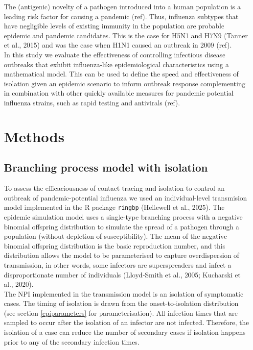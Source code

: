 \documentclass{article}
\begin{document}
The (antigenic) novelty of a pathogen introduced into a human population is a leading risk factor for causing a pandemic (ref). Thus, influenza subtypes that have negligible levels of existing immunity in the population are probable epidemic and pandemic candidates. This is the case for H5N1 and H7N9 (Tanner et al., 2015) and was the case when H1N1 caused an outbreak in 2009 (ref). \\

In this study we evaluate the effectiveness of controlling infectious disease outbreaks that exhibit influenza-like epidemiological characteristics using a mathematical model. This can be used to define the speed and effectiveness of isolation given an epidemic scenario to inform outbreak response complementing in combination with other quickly available measures for pandemic potential influenza strains, such as rapid testing and antivirals (ref).

\section{Methods}

\subsection{Branching process model with isolation}

To assess the efficaciousness of contact tracing and isolation to control an outbreak of pandemic-potential influenza we used an individual-level transmision model implemented in the R package \texttt{ringbp} (Hellewell et al., 2025). The epidemic simulation model uses a single-type branching process with a negative binomial offspring distribution to simulate the spread of a pathogen through a population (without depletion of susceptibility). The mean of the negative binomial offspring distribution is the basic reproduction number, and this distribution allows the model to be parameterised to capture overdispersion of transmission, in other words, some infectors are superspreaders and infect a disproportionate number of individuals (Lloyd-Smith et al., 2005; Kucharski et al., 2020). \\

The NPI implemented in the transmission model is an isolation of symptomatic cases. The timing of isolation is drawn from the onset-to-isolation distribution (see section \ref{epiparameters} for parameterisation). All infection times that are sampled to occur after the isolation of an infector are not infected. Therefore, the isolation of a case can reduce the number of secondary cases if isolation happens prior to any of the secondary infection times. \\
\end{document}
